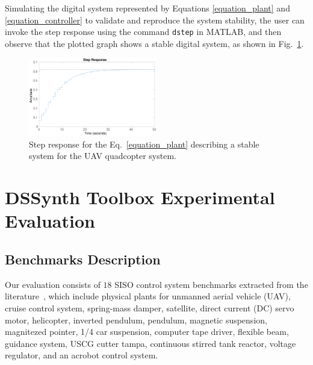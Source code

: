 \documentclass[10pt,conference]{IEEEtran}
\newcommand\tool{{DSSynth Toolbox}\xspace}
\begin{document}
Simulating the digital system represented by Equations \eqref{equation_plant} and \eqref{equation_controller} 
to validate and reproduce the system stability, the user can invoke the step response using the 
command \texttt{dstep} in MATLAB, and then observe that the plotted graph shows a stable digital system, 
as shown in Fig.~\ref{step-response}.
%
\begin{figure}[ht]
  \includegraphics[width=0.5\textwidth]{step-response.eps}
  \caption{Step response for the Eq.~\eqref{equation_plant} describing a stable system for the UAV quadcopter system.}
  \label{step-response}
\end{figure}

\section{\tool Experimental Evaluation}

\subsection{Benchmarks Description}
\label{benchmarks-description}

Our evaluation consists of $18$ SISO control system benchmarks 
extracted from the literature~\cite{abate2017,abatecav2017,bouabdallah, acrobot,cstr,KOKOTOVIC198023,gajic2008optimal,Franklin15, maglev, converters, CTMS,DBLP:journals/tc/BessaIPCF17,DBLP:journals/dafes/BessaICF16},
which include physical plants for unmanned aerial vehicle (UAV), cruise control system, 
spring-mass damper, satellite, direct current (DC) servo motor, helicopter, 
inverted pendulum, pendulum, magnetic suspension, magnitezed pointer, 1/4 car suspension, 
computer tape driver, flexible beam, guidance system, USCG cutter tampa, continuous stirred tank reactor, 
voltage regulator, and an acrobot control system.
\end{document}
